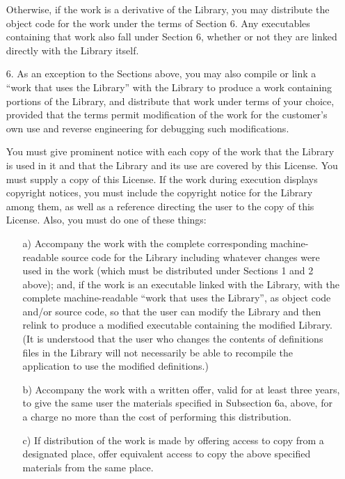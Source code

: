 \begin{multicols}{3}
\begin{itemize}
   Otherwise, if the work is a derivative of the Library, you may
   distribute the object code for the work under the terms of Section
   6. Any executables containing that work also fall under Section 6,
   whether or not they are linked directly with the Library itself.
   
 \item[6.] As an exception to the Sections above, you may also compile
   or link a ``work that uses the Library'' with the Library to produce
   a work containing portions of the Library, and distribute that work
   under terms of your choice, provided that the terms permit
   modification of the work for the customer's own use and reverse
   engineering for debugging such modifications.

   You must give prominent notice with each copy of the work that the
   Library is used in it and that the Library and its use are covered by
   this License. You must supply a copy of this License. If the work during
   execution displays copyright notices, you must include the copyright
   notice for the Library among them, as well as a reference directing the
   user to the copy of this License. Also, you must do one of these things:

   \begin{itemize}
   \item[a)] Accompany the work with the complete corresponding
     machine-readable source code for the Library including whatever
     changes were used in the work (which must be distributed under
     Sections 1 and 2 above); and, if the work is an executable linked
     with the Library, with the complete machine-readable ``work that
     uses the Library'', as object code and/or source code, so that
     the user can modify the Library and then relink to produce a
     modified executable containing the modified Library. (It is
     understood that the user who changes the contents of definitions
     files in the Library will not necessarily be able to recompile
     the application to use the modified definitions.)
     
   \item[b)] Accompany the work with a written offer, valid for at
     least three years, to give the same user the materials specified
     in Subsection 6a, above, for a charge no more than the cost of
     performing this distribution.
     
   \item[c)] If distribution of the work is made by offering access to
     copy from a designated place, offer equivalent access to copy the
     above specified materials from the same place.
     

\end{itemize}
\end{itemize}
\end{multicols}
